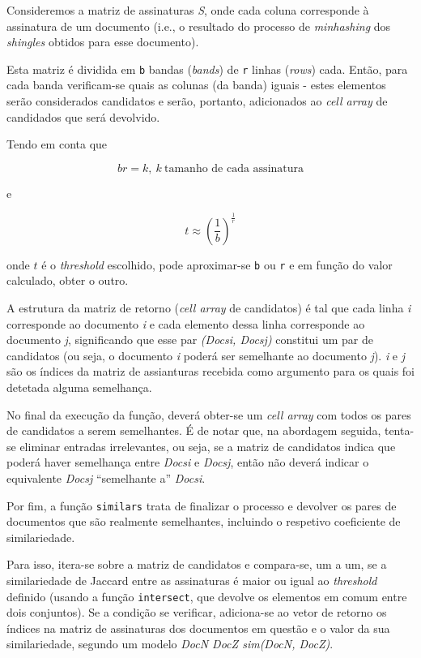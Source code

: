 \documentclass[a4paper,11pt,openright,oneside]{report}
\begin{document}
Consideremos a matriz de assinaturas \textit{S}, onde cada coluna corresponde à assinatura de um documento (i.e., o resultado do processo de \textit{minhashing} dos \textit{shingles} obtidos para esse documento).

Esta matriz é dividida em \texttt{b} bandas (\textit{bands}) de \texttt{r} linhas (\textit{rows}) cada. Então, para cada banda verificam-se quais as colunas (da banda) iguais - estes elementos serão considerados candidatos e serão, portanto, adicionados ao \textit{cell array} de candidados que será devolvido.

Tendo em conta que

$$ br = k,\ k\ \text{tamanho de cada assinatura} $$

e

$$ t \approx \left(\frac{1}{b}\right) ^ {\frac{1}{r}} $$

onde $t$ é o \textit{threshold} escolhido, pode aproximar-se \texttt{b} ou \texttt{r} e em função do valor calculado, obter o outro.

A estrutura da matriz de retorno (\textit{cell array} de candidatos) é tal que cada linha \textit{i} corresponde ao documento \textit{i} e cada elemento dessa linha corresponde ao documento \textit{j}, significando que esse par \textit{(Docs{i}, Docs{j})} constitui um par de candidatos (ou seja, o documento \textit{i} poderá ser semelhante ao documento \textit{j}). \textit{i} e \textit{j} são os índices da matriz de assianturas recebida como argumento para os quais foi detetada alguma semelhança.

No final da execução da função, deverá obter-se um \textit{cell array} com todos os pares de candidatos a serem semelhantes. É de notar que, na abordagem seguida, tenta-se eliminar entradas irrelevantes, ou seja, se a matriz de candidatos indica que poderá haver semelhança entre \textit{Docs{i}} e \textit{Docs{j}}, então não deverá indicar o equivalente \textit{Docs{j}} ``semelhante a'' \textit{Docs{i}}.

Por fim, a função \texttt{similars} trata de finalizar o processo e devolver os pares de documentos que são realmente semelhantes, incluindo o respetivo coeficiente de similariedade.

Para isso, itera-se sobre a matriz de candidatos e compara-se, um a um, se a similariedade de Jaccard entre as assinaturas é maior ou igual ao \textit{threshold} definido (usando a função \texttt{intersect}, que devolve os elementos em comum entre dois conjuntos). Se a condição se verificar, adiciona-se ao vetor de retorno os índices na matriz de assinaturas dos documentos em questão e o valor da sua similariedade, segundo um modelo \textit{DocN  DocZ  sim(DocN, DocZ)}.
\end{document}
